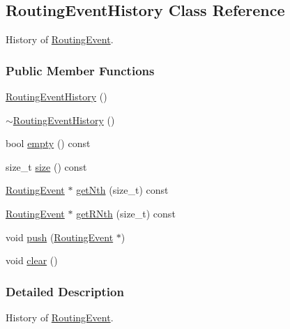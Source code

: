 \hypertarget{classKite_1_1RoutingEventHistory}{}\subsection{Routing\+Event\+History Class Reference}
\label{classKite_1_1RoutingEventHistory}


History of \mbox{\hyperlink{classKite_1_1RoutingEvent}{Routing\+Event}}.  


\subsubsection*{Public Member Functions}
\begin{DoxyCompactItemize}
\item 
\mbox{\hyperlink{classKite_1_1RoutingEventHistory_af286a3887c4925a37eadc8018d584aa3}{Routing\+Event\+History}} ()
\item 
\mbox{\hyperlink{classKite_1_1RoutingEventHistory_a5a7671b3e27e93b018cf407a7eba9ce7}{$\sim$\+Routing\+Event\+History}} ()
\item 
bool \mbox{\hyperlink{classKite_1_1RoutingEventHistory_a644718bb2fb240de962dc3c9a1fdf0dc}{empty}} () const
\item 
size\+\_\+t \mbox{\hyperlink{classKite_1_1RoutingEventHistory_a259cb5a711406a8c3e5d937eb9350cca}{size}} () const
\item 
\mbox{\hyperlink{classKite_1_1RoutingEvent}{Routing\+Event}} $\ast$ \mbox{\hyperlink{classKite_1_1RoutingEventHistory_a81fbd6a845cb991db9f03f13edb14a50}{get\+Nth}} (size\+\_\+t) const
\item 
\mbox{\hyperlink{classKite_1_1RoutingEvent}{Routing\+Event}} $\ast$ \mbox{\hyperlink{classKite_1_1RoutingEventHistory_abf422c3119f0b121ce124aff979eafff}{get\+R\+Nth}} (size\+\_\+t) const
\item 
void \mbox{\hyperlink{classKite_1_1RoutingEventHistory_ac802427673567526d06af911e94f7216}{push}} (\mbox{\hyperlink{classKite_1_1RoutingEvent}{Routing\+Event}} $\ast$)
\item 
void \mbox{\hyperlink{classKite_1_1RoutingEventHistory_ac8bb3912a3ce86b15842e79d0b421204}{clear}} ()
\end{DoxyCompactItemize}


\subsubsection{Detailed Description}
History of \mbox{\hyperlink{classKite_1_1RoutingEvent}{Routing\+Event}}. 

